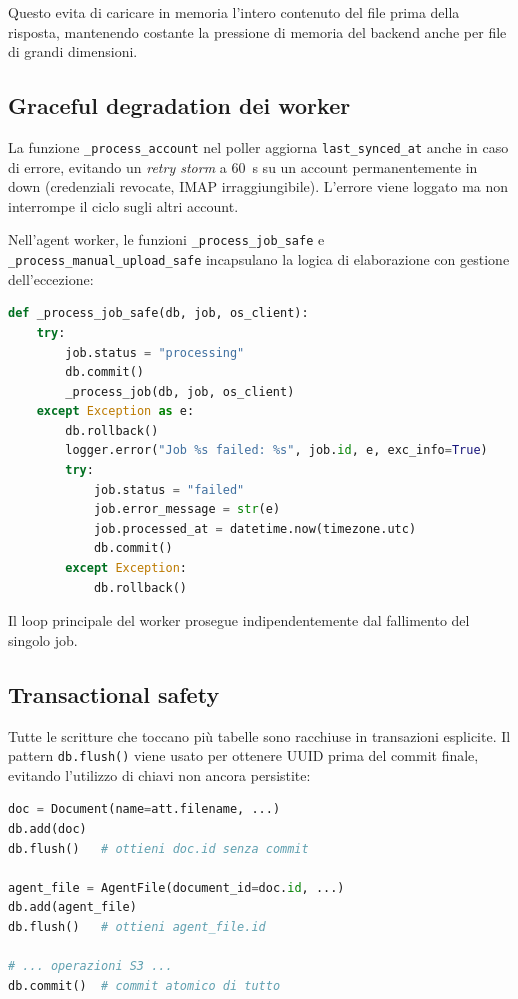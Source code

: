 Questo evita di caricare in memoria l'intero contenuto del file prima della risposta,
mantenendo costante la pressione di memoria del backend anche per file di grandi dimensioni.

\subsection{Graceful degradation dei worker}

La funzione \texttt{\_process\_account} nel poller aggiorna \texttt{last\_synced\_at}
anche in caso di errore, evitando un \emph{retry storm} a 60~s su un account
permanentemente in down (credenziali revocate, IMAP irraggiungibile). L'errore viene
loggato ma non interrompe il ciclo sugli altri account.

Nell'agent worker, le funzioni \texttt{\_process\_job\_safe} e
\texttt{\_process\_manual\_upload\_safe} incapsulano la logica di elaborazione con
gestione dell'eccezione:

\begin{lstlisting}[language=Python, caption={Error handling nel worker (\texttt{agent\_worker/worker.py}).}]
def _process_job_safe(db, job, os_client):
    try:
        job.status = "processing"
        db.commit()
        _process_job(db, job, os_client)
    except Exception as e:
        db.rollback()
        logger.error("Job %s failed: %s", job.id, e, exc_info=True)
        try:
            job.status = "failed"
            job.error_message = str(e)
            job.processed_at = datetime.now(timezone.utc)
            db.commit()
        except Exception:
            db.rollback()
\end{lstlisting}

Il loop principale del worker prosegue indipendentemente dal fallimento del singolo job.

\subsection{Transactional safety}

Tutte le scritture che toccano pi\`u tabelle sono racchiuse in transazioni esplicite.
Il pattern \texttt{db.flush()} viene usato per ottenere UUID prima del commit finale,
evitando l'utilizzo di chiavi non ancora persistite:

\begin{lstlisting}[language=Python, caption={Uso di flush per ottenere UUID pre-commit.}]
doc = Document(name=att.filename, ...)
db.add(doc)
db.flush()   # ottieni doc.id senza commit

agent_file = AgentFile(document_id=doc.id, ...)
db.add(agent_file)
db.flush()   # ottieni agent_file.id

# ... operazioni S3 ...
db.commit()  # commit atomico di tutto
\end{lstlisting}

